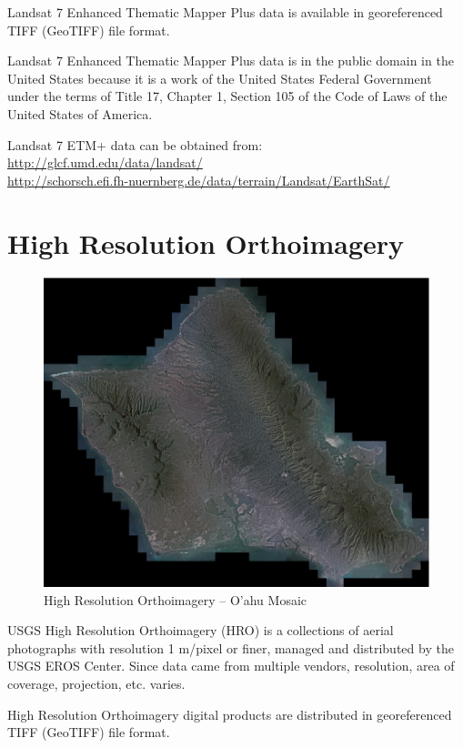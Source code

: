 Landsat 7 Enhanced Thematic Mapper Plus data is available in georeferenced TIFF (GeoTIFF) file format.

Landsat 7 Enhanced Thematic Mapper Plus data is in the public domain in the United States because it is a work of the United States Federal Government under the terms of Title 17, Chapter 1, Section 105 of the Code of Laws of the United States of America.

Landsat 7 ETM+ data can be obtained from: \cite{Terrain-LandsatGLCF, Terrain-LandsatTHN} \\
\url{http://glcf.umd.edu/data/landsat/} \\
\url{http://schorsch.efi.fh-nuernberg.de/data/terrain/Landsat/EarthSat/}

\section{High Resolution Orthoimagery}

\begin{figure}[h!]
  \centering
  \includegraphics[width=120mm]{eps/usgs_hro_oahu.eps}
  \caption{High Resolution Orthoimagery -- O'ahu Mosaic}
\end{figure}

USGS High Resolution Orthoimagery (HRO) is a collections of aerial photographs with resolution 1 m/pixel or finer, managed and distributed by the USGS EROS Center. Since data came from multiple vendors, resolution, area of coverage, projection, etc. varies.

High Resolution Orthoimagery digital products are distributed in georeferenced TIFF (GeoTIFF) file format.

